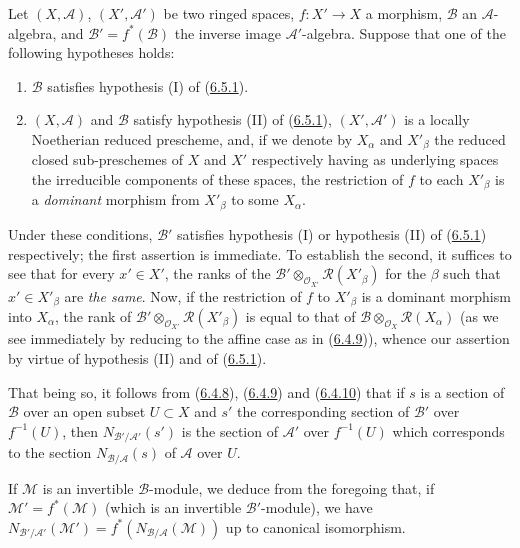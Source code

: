 \begin{env}[6.5.4]
\label{II.6.5.4}
Let $(X,\mathcal{A})$, $(X',\mathcal{A}')$ be two ringed spaces,
$f:X'\to X$ a morphism, $\mathcal{B}$ an $\mathcal{A}$-algebra, and
$\mathcal{B}'=f^*(\mathcal{B})$ the inverse image $\mathcal{A}'$-algebra.
Suppose that one of the following hypotheses holds:
\begin{enumerate}
\item[$1^\circ$] $\mathcal{B}$ satisfies hypothesis (I) of
(\hyperref[II.6.5.1]{6.5.1}).
\item[$2^\circ$] $(X,\mathcal{A})$ and $\mathcal{B}$ satisfy hypothesis
(II) of (\hyperref[II.6.5.1]{6.5.1}), $(X',\mathcal{A}')$ is a locally
Noetherian reduced prescheme, and, if we denote by $X_\alpha$ and
$X'_\beta$ the reduced closed sub-preschemes of $X$ and $X'$ respectively
having as underlying spaces the irreducible components of these spaces, the
restriction of $f$ to each $X'_\beta$ is a \emph{dominant} morphism from
$X'_\beta$ to some $X_\alpha$.
\end{enumerate}
Under these conditions, $\mathcal{B}'$ satisfies hypothesis (I) or
hypothesis (II) of (\hyperref[II.6.5.1]{6.5.1}) respectively; the first
assertion is immediate. To establish the second, it suffices to see that for
every $x'\in X'$, the ranks of the
$\mathcal{B}'\otimes_{\mathcal{O}_{X'}}\mathcal{R}(X'_\beta)$ for the $\beta$
such that $x'\in X'_\beta$ are \emph{the same}. Now, if the restriction of
$f$ to $X'_\beta$ is a dominant morphism into $X_\alpha$, the rank of
$\mathcal{B}'\otimes_{\mathcal{O}_{X'}}\mathcal{R}(X'_\beta)$ is equal to that
of $\mathcal{B}\otimes_{\mathcal{O}_X}\mathcal{R}(X_\alpha)$ (as we see
immediately by reducing to the affine case as in
(\hyperref[II.6.4.9]{6.4.9})), whence our assertion by virtue of
hypothesis (II) and of (\hyperref[II.6.5.1]{6.5.1}).


That being so, it follows from (\hyperref[II.6.4.8]{6.4.8}),
(\hyperref[II.6.4.9]{6.4.9}) and (\hyperref[II.6.4.10]{6.4.10}) that if
$s$ is a section of $\mathcal{B}$ over an open subset $U\subset X$ and
$s'$ the corresponding section of $\mathcal{B}'$ over $f^{-1}(U)$, then
$N_{\mathcal{B}'/\mathcal{A}'}(s')$ is the section of $\mathcal{A}'$ over
$f^{-1}(U)$ which corresponds to the section
$N_{\mathcal{B}/\mathcal{A}}(s)$ of $\mathcal{A}$ over $U$.

If $\mathcal{M}$ is an invertible $\mathcal{B}$-module, we deduce from the
foregoing that, if $\mathcal{M}'=f^*(\mathcal{M})$ (which is an invertible
$\mathcal{B}'$-module), we have
$N_{\mathcal{B}'/\mathcal{A}'}(\mathcal{M}')
=f^*(N_{\mathcal{B}/\mathcal{A}}(\mathcal{M}))$ up to canonical
isomorphism.
\end{env}

